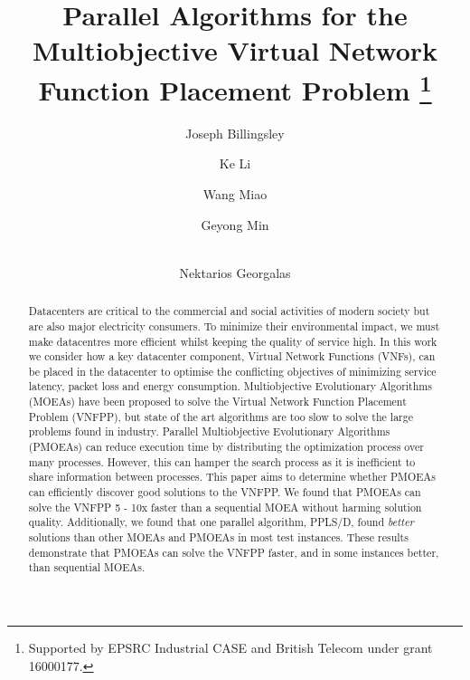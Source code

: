 \documentclass[runningheads]{llncs}
\begin{document}
\title{Parallel Algorithms for the Multiobjective Virtual Network Function Placement Problem \thanks{Supported by EPSRC Industrial CASE and British Telecom under grant 16000177.}}

\author{
	Joseph Billingsley \and
	Ke Li \and
	Wang Miao \and
	Geyong Min \and \\
	Nektarios Georgalas}




\maketitle

\begin{abstract}
	Datacenters are critical to the commercial and social activities of modern society but are also major electricity consumers. To minimize their environmental impact, we must make datacentres more efficient whilst keeping the quality of service high. In this work we consider how a key datacenter component, Virtual Network Functions (VNFs), can be placed in the datacenter to optimise the conflicting objectives of minimizing service latency, packet loss and energy consumption. Multiobjective Evolutionary Algorithms (MOEAs) have been proposed to solve the Virtual Network Function Placement Problem (VNFPP), but state of the art algorithms are too slow to solve the large problems found in industry. Parallel Multiobjective Evolutionary Algorithms (PMOEAs) can reduce execution time by distributing the optimization process over many processes. However, this can hamper the search process as it is inefficient to share information between processes. This paper aims to determine whether PMOEAs can efficiently discover good solutions to the VNFPP. We found that PMOEAs can solve the VNFPP 5 - 10x faster than a sequential MOEA without harming solution quality. Additionally, we found that one parallel algorithm, PPLS/D, found \textit{better} solutions than other MOEAs and PMOEAs in most test instances. These results demonstrate that PMOEAs can solve the VNFPP faster, and in some instances better, than sequential MOEAs.

\end{abstract}
\end{document}
